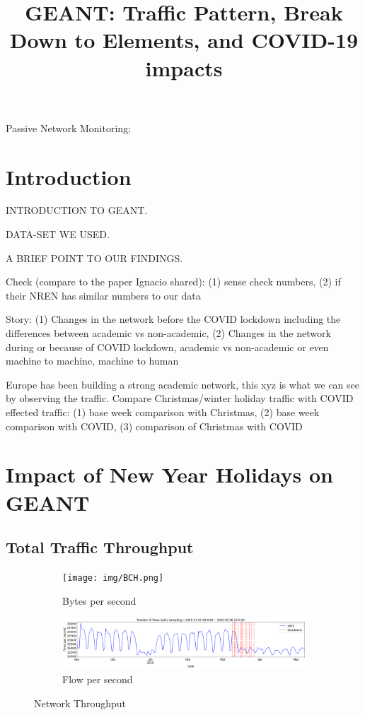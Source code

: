 \documentclass[10pt, journal, letterpaper]{IEEEtran}
\newcommand\linearFigSze{0.48}
\begin{document}
\title{GEANT: Traffic Pattern, Break Down to Elements, and COVID-19 impacts}
\author{}
\maketitle	
\begin{abstract}
\end{abstract}	
\begin{IEEEkeywords} 
    Passive Network Monitoring;
\end{IEEEkeywords}

\section{Introduction}
INTRODUCTION TO GEANT.

DATA-SET WE USED.

A BRIEF POINT TO OUR FINDINGS.

Check (compare to the paper Ignacio shared): (1) sense check numbers, (2) if their NREN has similar numbers to our data

Story: (1) Changes in the network before the COVID lockdown including the differences between academic vs non-academic, (2) Changes in the network during or because of COVID lockdown, academic vs non-academic or even machine to machine, machine to human

Europe has been building a strong academic network, this xyz is what we can see by observing the traffic. Compare Christmas/winter holiday traffic with COVID effected traffic: (1) base week comparison with Christmas, (2) base week comparison with COVID, (3) comparison of Christmas with COVID

\section{Impact of New Year Holidays on GEANT}

\subsection{Total Traffic Throughput}
\begin{figure}
    \begin{subfigure}{\linearFigSze\textwidth}
          \centering
          \texttt{[image: img/BCH.png]}
          \caption{Bytes per second}
          \label{fig:traffic_trend_bps}
    \end{subfigure}
    \begin{subfigure}{\linearFigSze\textwidth}
          \centering
          \includegraphics[width=\columnwidth]{img/traffic_trend_fps.png}
          \caption{Flow per second}
          \label{fig:traffic_trend_fps}
    \end{subfigure}
    \caption{Network Throughput}
    \label{fig:network_throughput}
\end{figure}
\end{document}

